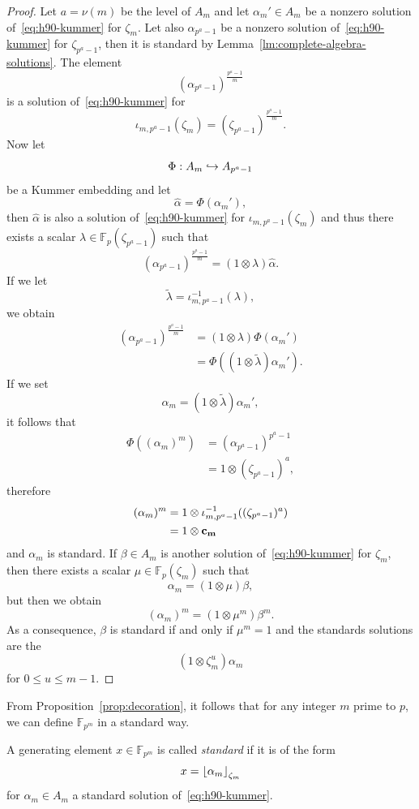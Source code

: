 \begin{proof}
 Let $a=\nu(m)$ be the level of $A_m$ and let $\alpha_m'\in A_m$ be a nonzero solution
 of~\eqref{eq:h90-kummer} for $\zeta_m$. Let also $\alpha_{p^a-1}$ be a nonzero
 solution of~\eqref{eq:h90-kummer} for $\zeta_{p^a-1}$, then it is standard by
 Lemma~\ref{lm:complete-algebra-solutions}. The element 
 \[
   (\alpha_{p^a-1})^{\frac{p^a-1}{m}}
 \]
 is a solution of~\eqref{eq:h90-kummer} for
 \[
   \iota_{m, p^a-1}(\zeta_m) = (\zeta_{p^a-1})^{\frac{p^a-1}{m}}.
 \]
 Now let
 \[
   \Phi:A_m\hookrightarrow A_{p^a-1}
 \]
 be a Kummer embedding and let
 \[
   \hat\alpha = \Phi(\alpha_m'),
 \]
 then $\hat\alpha$ is also a solution of~\eqref{eq:h90-kummer} for
 $\iota_{m, p^a-1}(\zeta_m)$ and thus there exists a scalar
 $\lambda\in\mathbb{F}_p(\zeta_{p^a-1})$ such that
 \[
   (\alpha_{p^a-1})^{\frac{p^a-1}{m}} = (1\otimes\lambda)\hat{\alpha} .
 \]
 If we let
 \[
   \tilde\lambda = \iota_{m, p^a-1}^{-1}(\lambda),
 \]
 we obtain
 \begin{align*}
   (\alpha_{p^a-1})^{\frac{p^a-1}{m}} &= (1\otimes\lambda)\Phi(\alpha_m') \\
   &= \Phi( (1\otimes\tilde\lambda)\alpha_m').
 \end{align*}
If we set 
\[
  \alpha_m = (1\otimes\tilde\lambda)\alpha_m',
\]
it follows that
\begin{align*}
  \Phi((\alpha_m)^m) &= (\alpha_{p^a-1})^{p^a-1} \\
  &= 1\otimes(\zeta_{p^a-1})^a,
\end{align*}
therefore
\begin{align*}
  (\alpha_m)^m &= 1\otimes\iota_{m, p^a-1}^{-1}( (\zeta_{p^a-1})^a) \\
  &= 1 \otimes \mathbf{c_{m}}
\end{align*}
and $\alpha_m$ is standard. If $\beta\in A_m$ is another solution
of~\eqref{eq:h90-kummer} for $\zeta_m$, then there exists a scalar
$\mu\in\mathbb{F}_p(\zeta_m)$ such that
\[
  \alpha_m= (1\otimes\mu)\beta,
\]
but then we obtain
\[
  (\alpha_m)^m = (1\otimes\mu^m)\beta^m.
\]
As a consequence, $\beta$ is standard if and only if $\mu^m = 1$ and the
standards solutions are the
\[
  (1\otimes\zeta_m^u)\alpha_m
\]
for $0\leq u\leq m-1$.
\end{proof}
From Proposition~\ref{prop:decoration}, it follows that for any integer $m$
prime to $p$, we can define $\mathbb{F}_{p^{m}}$ in a standard way.
\begin{defi}
  A generating element $x\in\mathbb{F}_{p^{m}}$ is called \emph{standard} if it
  is of the form
  \[
    x = \left\lfloor \alpha_m \right\rfloor_{\zeta_m}
  \]
  for $\alpha_m\in A_m$ a standard solution of~\eqref{eq:h90-kummer}.
\end{defi}
